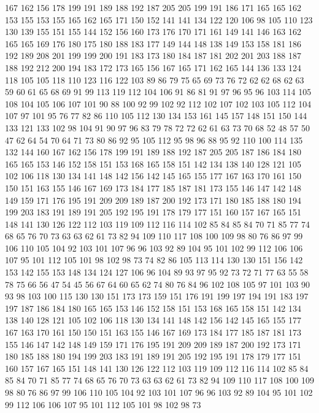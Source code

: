 167 162 156 178 199 191 189 188 192 187 205 205 199 191 186 171 165 165 162 153
155 153 155 165 162 165 171 150 152 141 141 134 122 120 106 98 105 110 123 130
139 155 151 155 144 152 156 160 173 176 170 171 161 149 141 146 163 162 165 165
169 176 180 175 180 188 183 177 149 144 148 138 149 153 158 181 186 192 189 208
201 199 199 200 191 183 173 180 184 187 181 202 201 203 188 187 188 192 212 200
194 183 172 173 165 156 167 165 171 162 165 144 136 133 124 118 105 105 118 110
123 116 122 103 89 86 79 75 65 69 73 76 72 62 62 68 62 63 59 60
61 65 68 69 91 99 113 119 112 104 106 91 86 81 91 97 96 95 96 103
114 105 108 104 105 106 107 101 90 88 100 92 99 102 92 112 102 107 102 103
105 112 104 107 97 101 95 76 77 82 86 110 105 112 130 134 153 161 145 157
148 151 150 144 133 121 133 102 98 104 91 90 97 96 83 79 78 72 72 62
61 63 73 70 68 52 48 57 50 47 62 64 54 70 64 71 73 80 86 92
95 105 112 95 98 96 88 95 92 110 100 114 135 132 144 160 167 162 156 178
199 191 189 188 192 187 205 205 187 186 184 180 165 165 153 146 152 158 151 153
168 165 158 151 142 134 138 140 128 121 105 102 106 118 130 134 141 148 142 156
142 145 165 155 177 167 163 170 161 150 150 151 163 155 146 167 169 173 184 177
185 187 181 173 155 146 147 142 148 149 159 171 176 195 191 209 209 189 187 200
192 173 171 180 185 188 180 194 199 203 183 191 189 191 205 192 195 191 178 179
177 151 160 157 167 165 151 148 141 130 126 122 112 103 119 109 112 116 114 102
85 84 85 84 70 71 85 77 74 68 65 76 70 73 63 63 62 61 73 82
94 109 110 117 108 100 109 98 80 76 86 97 99 106 110 105 104 92 103 101
107 96 96 103 92 89 104 95 101 102 99 112 106 106 107 95 101 112 105 101
98 102 98 73 74 82 86 105 113 114 130 130 151 156 142 153 142 155 153 148
134 124 127 106 96 104 89 93 97 95 92 73 72 71 77 63 55 58 78 75
66 56 47 54 45 56 67 64 60 65 62 74 80 76 84 96 102 108 105 97
101 103 90 93 98 103 100 115 130 130 151 173 173 159 151 176 191 199 197 194
191 183 197 197 187 186 184 180 165 165 153 146 152 158 151 153 168 165 158 151
142 134 138 140 128 121 105 102 106 118 130 134 141 148 142 156 142 145 165 155
177 167 163 170 161 150 150 151 163 155 146 167 169 173 184 177 185 187 181 173
155 146 147 142 148 149 159 171 176 195 191 209 209 189 187 200 192 173 171 180
185 188 180 194 199 203 183 191 189 191 205 192 195 191 178 179 177 151 160 157
167 165 151 148 141 130 126 122 112 103 119 109 112 116 114 102 85 84 85 84
70 71 85 77 74 68 65 76 70 73 63 63 62 61 73 82 94 109 110 117
108 100 109 98 80 76 86 97 99 106 110 105 104 92 103 101 107 96 96 103
92 89 104 95 101 102 99 112 106 106 107 95 101 112 105 101 98 102 98 73
